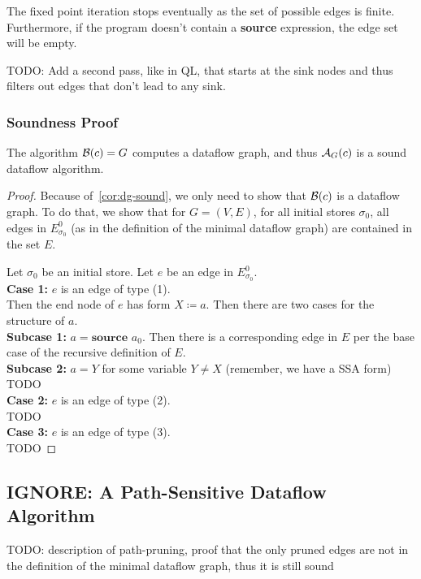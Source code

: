 The fixed point iteration stops eventually as the set of possible edges is
finite. Furthermore, if the program doesn't contain a \textbf{source} expression,
the edge set will be empty.

TODO: Add a second pass, like in QL, that starts at the sink nodes and thus
filters out edges that don't lead to any sink.

\subsubsection*{Soundness Proof}
\begin{theorem}
    The algorithm $\operatorname{\mathcal{B}}(c) = G$ computes a dataflow graph, and thus 
    $\operatorname{\mathcal{A}}_G(c)$ is a sound dataflow algorithm.
\end{theorem}
\begin{proof}
    Because of~\autoref{cor:dg-sound}, we only need to show that $\operatorname{\mathcal{B}}(c)$ is 
    a dataflow graph.
    To do that, we show that for $G=(V, E)$, for all initial stores $\sigma_0$,
    all edges in $E^0_{\sigma_0}$ (as in the definition of the minimal dataflow
    graph) are contained in the set $E$.

    Let $\sigma_0$ be an initial store.
    Let $e$ be an edge in $E^0_{\sigma_0}$.\\
    \textbf{Case 1:} $e$ is an edge of type (1).\\
    Then the end node of $e$
    has form $X \coloneqq a$.
    Then there are two cases for the structure of $a$.\\
    \textbf{Subcase 1:} $a = \textbf{source }a_0$.
    Then there is a corresponding edge in $E$ per the base case of the recursive
    definition of $E$.\\
    \textbf{Subcase 2:} $a = Y$ for some variable $Y \neq X$ (remember, we have 
    a SSA form)
    TODO\\
    \textbf{Case 2:} $e$ is an edge of type (2).\\
    TODO\\
    \textbf{Case 3:} $e$ is an edge of type (3).\\
    TODO
\end{proof}


\subsection{IGNORE: A Path-Sensitive Dataflow Algorithm}
TODO: description of path-pruning, proof that the only pruned edges are not
in the definition of the minimal dataflow graph, thus it is still sound

